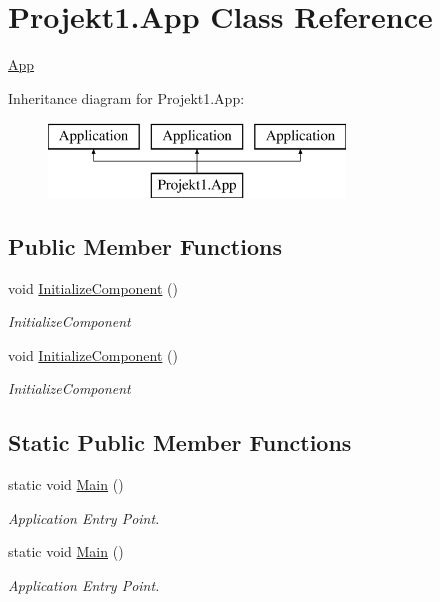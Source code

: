 \hypertarget{class_projekt1_1_1_app}{}\section{Projekt1.\+App Class Reference}
\label{class_projekt1_1_1_app}


\mbox{\hyperlink{class_projekt1_1_1_app}{App}}  


Inheritance diagram for Projekt1.\+App\+:\begin{figure}[H]
\begin{center}
\leavevmode
\includegraphics[height=2.000000cm]{class_projekt1_1_1_app}
\end{center}
\end{figure}
\subsection*{Public Member Functions}
\begin{DoxyCompactItemize}
\item 
void \mbox{\hyperlink{class_projekt1_1_1_app_ab98f0cfad2be8796f52d6f5883e0a06b}{Initialize\+Component}} ()
\begin{DoxyCompactList}\small\item\em Initialize\+Component \end{DoxyCompactList}\item 
void \mbox{\hyperlink{class_projekt1_1_1_app_ab98f0cfad2be8796f52d6f5883e0a06b}{Initialize\+Component}} ()
\begin{DoxyCompactList}\small\item\em Initialize\+Component \end{DoxyCompactList}\end{DoxyCompactItemize}
\subsection*{Static Public Member Functions}
\begin{DoxyCompactItemize}
\item 
static void \mbox{\hyperlink{class_projekt1_1_1_app_a3277cdd767e14a1c69be2aedd7004a5d}{Main}} ()
\begin{DoxyCompactList}\small\item\em Application Entry Point. \end{DoxyCompactList}\item 
static void \mbox{\hyperlink{class_projekt1_1_1_app_a3277cdd767e14a1c69be2aedd7004a5d}{Main}} ()
\begin{DoxyCompactList}\small\item\em Application Entry Point. \end{DoxyCompactList}\end{DoxyCompactItemize}



